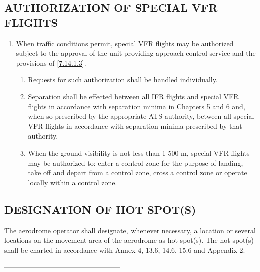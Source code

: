 \documentclass[../main.tex]{subfiles}
\begin{document}
    \subsection[Authorization of special VFR flights]{AUTHORIZATION OF SPECIAL VFR FLIGHTS}

    \begin{enumerate}[label=\arabic{section}.\arabic{subsection}.\arabic*]
        \item When traffic conditions permit, special VFR flights may be authorized subject to the approval of the unit providing approach control service and the provisions of \ref{7.14.1.3}.

        \begin{enumerate}[label=\arabic{section}.\arabic{subsection}.\arabic{enumi}.\arabic*]
            \item Requests for such authorization shall be handled individually.
            \item Separation shall be effected between all IFR flights and special VFR flights in accordance with separation minima in Chapters 5 and 6 and, when so prescribed by the appropriate ATS authority, between all special VFR flights in accordance with separation minima prescribed by that authority.
            \item \label{7.14.1.3} When the ground visibility is not less than 1 500 m, special VFR flights may be authorized to: enter a control zone for the purpose of landing, take off and depart from a control zone, cross a control zone or operate locally within a control zone.
        \end{enumerate}

    \end{enumerate}


    \subsection[Designation of hot spot(s)]{DESIGNATION OF HOT SPOT(S)}

    The aerodrome operator shall designate, whenever necessary, a location or several locations on the movement area of the aerodrome as hot spot(s). The hot spot(s) shall be charted in accordance with Annex 4, 13.6, 14.6, 15.6 and Appendix 2.


    \begin{center}
        \vspace{1cm}
        --------------------------------------------------
        \newpage
    \end{center}
        
\end{document}
